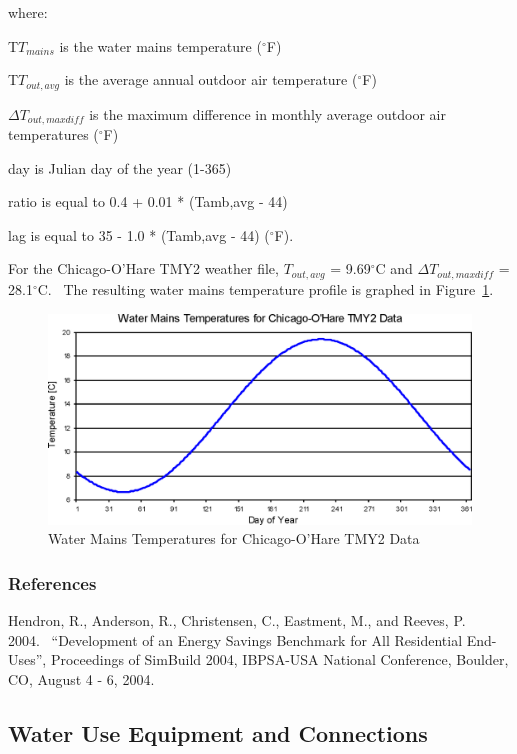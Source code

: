 where:

T\(T_{mains}\) is the water mains temperature (\(^{\circ}\)F)

T\(T_{out,avg}\) is the average annual outdoor air temperature (\(^{\circ}\)F)

\({\Delta T_{out,maxdiff}}\) is the maximum difference in monthly average outdoor air temperatures (\(^{\circ}\)F)

day is Julian day of the year (1-365)

ratio is equal to 0.4 + 0.01 * (Tamb,avg - 44)

lag is equal to 35 - 1.0 * (Tamb,avg - 44) (\(^{\circ}\)F).

For the Chicago-O'Hare TMY2 weather file, \(T_{out,avg}\) = 9.69\(^{\circ}\)C and \({\Delta T_{out,maxdiff}}\) = 28.1\(^{\circ}\)C.~ The resulting water mains temperature profile is graphed in Figure~\ref{fig:water-mains-temperatures-chicago-ohare-TMY2}.

\begin{figure}[htbp]
\centering
\includegraphics{media/image6936.png}
\caption{Water Mains Temperatures for Chicago-O'Hare TMY2 Data \protect \label{fig:water-mains-temperatures-chicago-ohare-TMY2}}
\end{figure}

\subsubsection{References}\label{references-052}

Hendron, R., Anderson, R., Christensen, C., Eastment, M., and Reeves, P.~ 2004.~ ``Development of an Energy Savings Benchmark for All Residential End-Uses'', Proceedings of SimBuild 2004, IBPSA-USA National Conference, Boulder, CO, August 4 - 6, 2004.

\subsection{Water Use Equipment and Connections}\label{water-use-equipment-and-connections}

